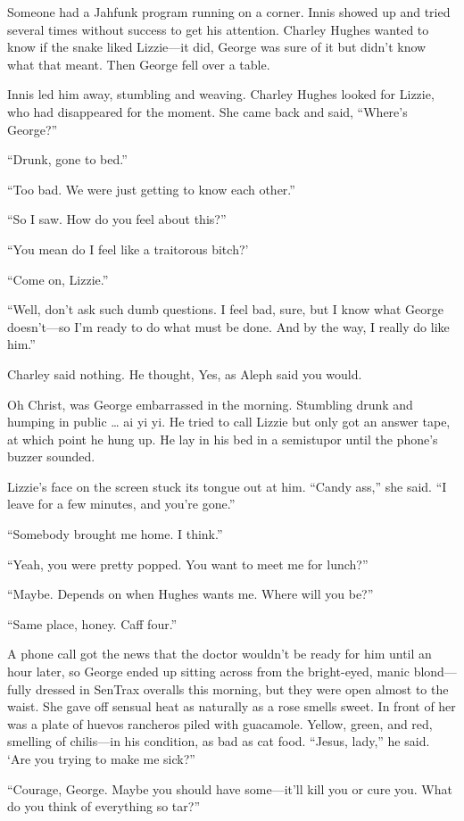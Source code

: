 Someone had a Jahfunk program running on a corner. Innis showed up and tried several times without success to get his attention. Charley Hughes wanted to know if the snake liked Lizzie—it did, George was sure of it but didn’t know what that meant. Then George fell over a table.

Innis led him away, stumbling and weaving. Charley Hughes looked for Lizzie, who had disappeared for the moment. She came back and said, “Where’s George?”

“Drunk, gone to bed.”

“Too bad. We were just getting to know each other.”

“So I saw. How do you feel about this?”

“You mean do I feel like a traitorous bitch?’

“Come on, Lizzie.”

“Well, don’t ask such dumb questions. I feel bad, sure, but I know what George doesn’t—so I’m ready to do what must be done. And by the way, I really do like him.”

Charley said nothing. He thought, Yes, as Aleph said you would.

Oh Christ, was George embarrassed in the morning. Stumbling drunk and humping in public … ai yi yi. He tried to call Lizzie but only got an answer tape, at which point he hung up. He lay in his bed in a semistupor until the phone’s buzzer sounded.

Lizzie’s face on the screen stuck its tongue out at him. “Candy ass,” she said. “I leave for a few minutes, and you’re gone.”

“Somebody brought me home. I think.”

“Yeah, you were pretty popped. You want to meet me for lunch?”

“Maybe. Depends on when Hughes wants me. Where will you be?”

“Same place, honey. Caff four.”

A phone call got the news that the doctor wouldn’t be ready for him until an hour later, so George ended up sitting across from the bright-eyed, manic blond—fully dressed in SenTrax overalls this morning, but they were open almost to the waist. She gave off sensual heat as naturally as a rose smells sweet. In front of her was a plate of huevos rancheros piled with guacamole. Yellow, green, and red, smelling of chilis—in his condition, as bad as cat food. “Jesus, lady,” he said. ‘Are you trying to make me sick?”

“Courage, George. Maybe you should have some—it’ll kill you or cure you. What do you think of everything so tar?”

